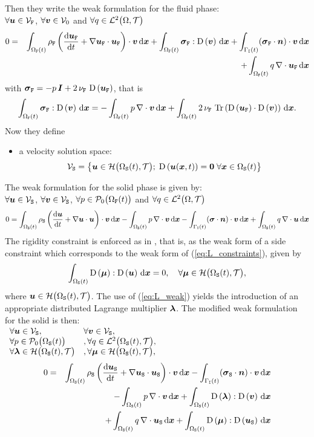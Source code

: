 \documentclass[10pt,a4paper]{article}
\begin{document}
Then they write the weak formulation for the fluid phase:\\
$\forall \vu \in \sVf$, $\forall \vv \in \sV_0$ and $\forall q \in \sL^2\big(\dom, \sT\big)$
%
\begin{eqnarray}
\nonumber 0 &=& \int_{\domf(t)}\rhof\left(\dt \vuf + \grad \vuf \cdot \vuf\right)\cdot\vv \,\d\vx + \int_{\domf(t)}\vsigmaf:\D{\vv} \, \d\vx+\int_{\boui(t)} (\vsigmaf\cdot\vec n) \cdot\vv \,\d\vx  \\
\label{eq:fluid_weak} &&  + \int_{\domf(t)} q\,\div \vuf \,\d\vx 
\end{eqnarray}
with $\vsigmaf = -p\,\Id + 2\,\nuf\,\D{\vuf} $, that is
$$ \int_{\domf(t)}\vsigmaf:\D{\vv} \, \d\vx = -\int_{\domf(t)}p\, \div\vv \, \d\vx + \int_{\domf(t)}2\,\nuf\,\trace{\D{\vuf}\cdot\D{\vv}} \, \d\vx. $$
%
Now they define
\begin{itemize}
\item a velocity solution space: 
$$\sVs = \left\{\vu \in \sH\big(\doms(t), \sT\big);\; \D{\vu(\vx, t)} = \vec 0 \; \forall \vx \in \doms(t) \right\}$$
\end{itemize}

The weak formulation for the solid phase is given by:\\
$\forall \vu \in \sVs$, $\forall \vv \in \sVs$, $\forall p \in \sP_0\big(\domf(t)\big)$ and $\forall q \in \sL^2\big(\dom, \sT\big)$
$$
0 = 
\int_{\doms(t)}\rhos\left(\dt \vu + \grad \vu \cdot \vu\right)\cdot\vv \,\d\vx 
- \int_{\doms(t)} p\,\div \vv \,\d\vx
- \int_{\boui(t)} (\vsigma\cdot\vec n) \cdot\vv \,\d\vx
+ \int_{\doms(t)} q\,\div \vu \,\d\vx
$$
The rigidity constraint is enforced as in \cite{glowinski1999distributed}, that is, as the weak form of a side constraint which corresponds to the weak form of (\ref{eq:L_constraints}), given by \cite{patankar2000new}
\begin{equation}
\label{eq:L_weak}
\int_{\doms(t)}\D\vmu : \D \vu\,\d \vx = 0, \quad \forall\vmu \in \sH\big(\doms(t),\sT\big),
\end{equation}
where $\vu \in \sH\big(\doms(t),\sT\big)$. The use of (\ref{eq:L_weak}) yields the introduction of an appropriate distributed Lagrange multiplier $\vlambda$. The modified weak formulation for the solid is then: \\
$
\begin{array}{ll}
\forall \vu \in \sVs, & \forall \vv \in \sVs, \\
\forall p \in \sP_0\big(\doms(t)\big) &,  \forall q \in \sL^2\big(\doms(t), \sT\big), \\
\forall \vlambda \in \sH\big(\doms(t),\sT\big)&,  \forall \vmu \in \sH\big(\doms(t),\sT\big), \\
\end{array}
$
\begin{eqnarray}
\nonumber 0 &=& 
\int_{\doms(t)}\rhos\left(\dt \vus + \grad \vus \cdot \vus\right)\cdot\vv \,\d\vx 
- \int_{\boui(t)} (\vsigmas\cdot\vec n) \cdot\vv \,\d\vx \\
\nonumber & & - \int_{\doms(t)} p\,\div \vv \,\d\vx + \int_{\doms(t)}\D\vlambda : \D \vv \, \d \vx \\
\label{eq:solid_weak} & & + \int_{\doms(t)} q\,\div \vus \,\d\vx + \int_{\doms(t)}\D\vmu : \D \vus\,\d \vx
\end{eqnarray}
\end{document}
